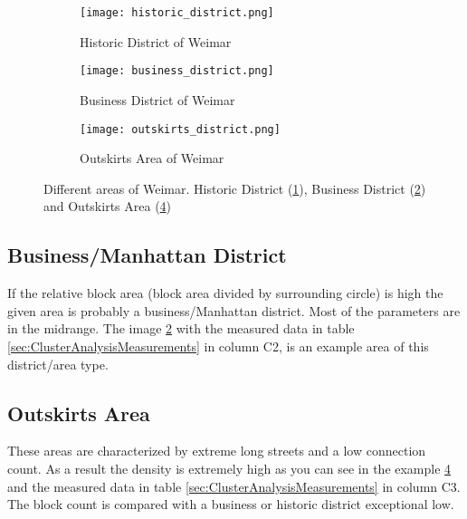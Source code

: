 \begin{figure}
    \centering
    \begin{subfigure}[b]{0.6\textwidth}
        \begin{mdframed}[style=mdthight]
            \texttt{[image: historic\_district.png]}
        \end{mdframed}
        \caption{Historic District of Weimar}
        \label{fig:historic_district}
    \end{subfigure}
    \par\medskip
    \begin{subfigure}[b]{0.6\textwidth}
        \begin{mdframed}[style=mdthight]
            \texttt{[image: business\_district.png]}
        \end{mdframed}
        \caption{Business District of Weimar}
        \label{fig:business_district}
    \end{subfigure}
    \begin{subfigure}[b]{0.6\textwidth}
        \begin{mdframed}[style=mdthight]
            \texttt{[image: outskirts\_district.png]}
        \end{mdframed}
        \caption{Outskirts Area of Weimar}
        \label{fig:outskirts_district}
    \end{subfigure}
    \caption{Different areas of Weimar. Historic District (\ref{fig:historic_district}), Business District (\ref{fig:business_district}) and Outskirts Area (\ref{fig:outskirts_district})}
\end{figure}

\subsection{Business/Manhattan District}
\label{sec:businessDistinct}
If the relative block area (block area divided by surrounding circle) is high the given area is probably a business/Manhattan district. Most of the parameters are in the midrange. The image \ref{fig:business_district} with the measured data in table \ref{sec:ClusterAnalysisMeasurements} in column C2, is an example area of this district/area type.

\subsection{Outskirts Area}
\label{sec:outskits}
These areas are characterized by extreme long streets and a low connection count. As a result the density is extremely high as you can see in the example \ref{fig:outskirts_district} and the measured data in table \ref{sec:ClusterAnalysisMeasurements} in column C3. The block count is compared with a business or historic district exceptional low.

